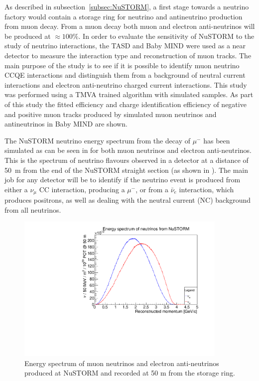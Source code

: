 As described in subsection~\ref{subsec:NuSTORM}, a first stage towards a neutrino factory would contain a storage ring for neutrino and antineutrino production from muon decay. From a muon decay both muon and electron anti-neutrinos will be produced at $\approx 100\%$. In order to evaluate the sensitivity of NuSTORM to the study of neutrino interactions, the TASD and Baby MIND were used as a near detector to measure the interaction type and reconstruction of muon tracks. The main purpose of the study is to see if it is possible to identify muon neutrino CCQE interactions and distinguish them from a background of neutral current interactions and electron anti-neutrino charged current interactions. This study was performed using a TMVA trained algorithm with simulated samples. As part of this study the fitted efficiency and charge identification efficiency of negative and positive muon tracks produced by simulated muon neutrinos and antineutrinos in Baby MIND are shown.

The NuSTORM neutrino energy spectrum from the decay of $\mu^-$ has been simulated as can be seen in  for both muon neutrinos and electron anti-neutrinos. This is the spectrum of neutrino flavours observed in a detector at a distance of 50~m from the end of the NuSTORM straight section (as shown in ). The main job for any detector will be to identify if the neutrino event is produced from either a $\nu_\mu$ CC interaction, producing a $\mu^-$, or from a $\bar{\nu}_e$ interaction, which produces positrons, as well as dealing with the neutral current (NC) background from all neutrinos.

\begin{figure}[h!]
\centering
\includegraphics[width=0.9\textwidth]{figures/eSpectrum.pdf}
\caption{Energy spectrum of muon neutrinos and electron anti-neutrinos produced at NuSTORM and recorded at 50 m from the storage ring.}
\label{fig:NuSTORMeSpectrum}
\end{figure}

